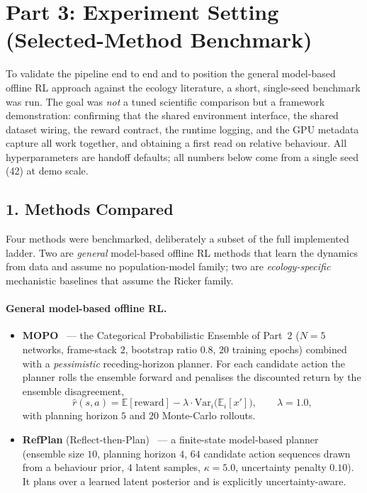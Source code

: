 \documentclass[11pt]{article}
\begin{document}
\newpage

\section*{Part 3: Experiment Setting (Selected-Method Benchmark)}
To validate the pipeline end to end and to position the general model-based
offline RL approach against the ecology literature, a short, single-seed
benchmark was run. The goal was \emph{not} a tuned scientific comparison but a
framework demonstration: confirming that the shared environment interface, the
shared dataset wiring, the reward contract, the runtime logging, and the GPU
metadata capture all work together, and obtaining a first read on relative
behaviour. All hyperparameters are handoff defaults; all numbers below come from a
single seed (42) at demo scale.

\subsection*{1. Methods Compared}
Four methods were benchmarked, deliberately a subset of the full implemented
ladder. Two are \emph{general} model-based offline RL methods that learn the
dynamics from data and assume no population-model family; two are
\emph{ecology-specific} mechanistic baselines that assume the Ricker family.

\paragraph{General model-based offline RL.}
\begin{itemize}
    \item \textbf{MOPO}~\cite{yu2020mopo} --- the Categorical Probabilistic Ensemble of Part~2
    ($N=5$ networks, frame-stack $2$, bootstrap ratio $0.8$, $20$ training epochs)
    combined with a \emph{pessimistic} receding-horizon planner. For each
    candidate action the planner rolls the ensemble forward and penalises the
    discounted return by the ensemble disagreement,
    \[
        \hat{r}(s,a) = \mathbb{E}[\text{reward}] - \lambda \cdot \mathrm{Var}_i\!\big(\mathbb{E}_i[x']\big),
        \qquad \lambda = 1.0,
    \]
    with planning horizon $5$ and $20$ Monte-Carlo rollouts.
    \item \textbf{RefPlan} (Reflect-then-Plan)~\cite{jeong2025refplan} --- a finite-state model-based
    planner (ensemble size $10$, planning horizon $4$, $64$ candidate action
    sequences drawn from a behaviour prior, $4$ latent samples, $\kappa = 5.0$,
    uncertainty penalty $0.10$). It plans over a learned latent posterior and is
    explicitly uncertainty-aware.
\end{itemize}
\end{document}
